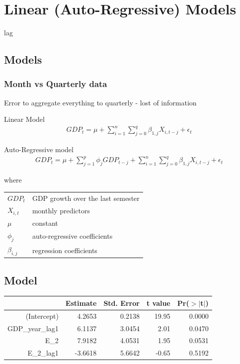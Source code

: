 \documentclass[12pt,a4paper,oneside]{book}
\begin{document}
\chapter{Linear (Auto-Regressive) Models}



lag

\section{Models}

\subsection{Month vs Quarterly data}

Error to aggregate everything to quarterly - lost of information


Linear Model
\begin{eqnarray}
    GDP_{t} = \mu + \sum^n_{i = 1} \sum^q_{j = 0}
       \beta_{1,j} X_{i,t-j} + \epsilon_t 
\end{eqnarray}

Auto-Regressive model
\begin{eqnarray}
    GDP_{t} = \mu + \sum^p_{j = 1} \phi_j GDP_{t-j} +         \sum^n_{i = 1} \sum^q_{j = 0}
       \beta_{1,j} X_{i,t-j} + \epsilon_t 
\end{eqnarray}

where   \\
\begin{tabular}{l l}
    $GDP_t$     & GDP growth over the last semester \\
    $X_{i,t}$   & monthly predictors \\
    $\mu$       & constant \\
    $\phi_j$    & auto-regressive coefficients \\
    $\beta_{i,j}$ & regression coefficients \\
\end{tabular}



\section{Model}

\begin{table}[ht]
\centering
\begin{tabular}{r r r r r}
  \hline
 & Estimate & Std. Error & t value & Pr($>$$|$t$|$) \\ 
  \hline
(Intercept) & 4.2653 & 0.2138 & 19.95 & 0.0000 \\ 
  GDP\_year\_lag1 & 6.1137 & 3.0454 & 2.01 & 0.0470 \\ 
  E\_2 & 7.9182 & 4.0531 & 1.95 & 0.0531 \\ 
  E\_2\_lag1 & -3.6618 & 5.6642 & -0.65 & 0.5192 \\ 
   \hline
\end{tabular}
\end{table}
\end{document}
